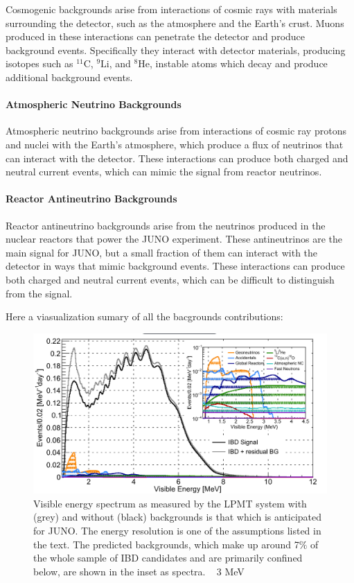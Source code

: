 Cosmogenic backgrounds arise from interactions of cosmic rays with materials surrounding the detector, such as the atmosphere and the Earth's crust. Muons produced in these interactions can penetrate the detector and produce background events. Specifically they interact with detector materials, producing isotopes such as $^{11}\mathrm{C}$, $^{9}\mathrm{Li}$, and $^{8}\mathrm{He}$, instable atoms which decay and produce additional background events.

\paragraph{Atmospheric Neutrino Backgrounds}

Atmospheric neutrino backgrounds arise from interactions of cosmic ray protons and nuclei with the Earth's atmosphere, which produce a flux of neutrinos that can interact with the detector. These interactions can produce both charged and neutral current events, which can mimic the signal from reactor neutrinos.

\paragraph{Reactor Antineutrino Backgrounds}

Reactor antineutrino backgrounds arise from the neutrinos produced in the nuclear reactors that power the JUNO experiment. These antineutrinos are the main signal for JUNO, but a small fraction of them can interact with the detector in ways that mimic background events. These interactions can produce both charged and neutral current events, which can be difficult to distinguish from the signal.


Here a viasualization sumary of all the bacgrounds contributions:

\begin{figure}[h]
	\centering
	\includegraphics[width=0.7\linewidth]{Images/backgrounds_spectrum}
	\caption{Visible energy spectrum as measured by the LPMT system with (grey) and without (black) backgrounds is that which is anticipated for JUNO. The energy resolution is one of the assumptions listed in the text. The predicted backgrounds, which make up around 7$\%$ of the whole sample of IBD candidates and are primarily confined below, are shown in the inset as spectra. ~ 3 MeV}
	\label{fig:backgroundsspectrum}
\end{figure}
